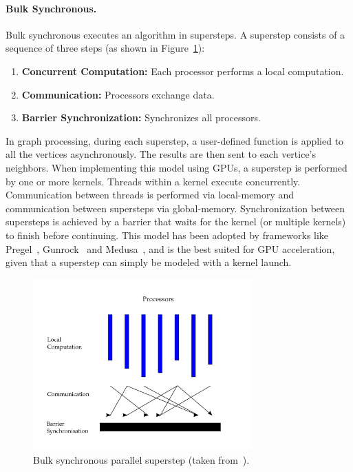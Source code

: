     \paragraph{\textbf{Bulk Synchronous}.} Bulk synchronous executes an algorithm in supersteps. A superstep consists of a sequence of three steps (as shown in Figure~\ref{fig:bsp}):
    \begin{enumerate}
        \item \textbf{Concurrent Computation:} Each processor performs a local computation.
        \item \textbf{Communication:} Processors exchange data.
        \item \textbf{Barrier Synchronization:} Synchronizes all processors.
    \end{enumerate}
    In graph processing, during each superstep, a user-defined function is applied to all the vertices asynchronously. The results are then sent to each vertice's neighbors. 
    When implementing this model using \gls{GPU}s, a superstep is performed by one or more kernels. Threads within a kernel execute concurrently. Communication between threads is performed via local-memory and communication between supersteps via global-memory. Synchronization between supersteps is achieved by a barrier that waits for the kernel (or multiple kernels) to finish before continuing.
    This model has been adopted by frameworks like Pregel~\cite{paper:pregel}, Gunrock~\cite{paper:gunrock} and Medusa~\cite{paper:medusa}, and is the best suited for \gls{GPU} acceleration, given that a superstep can simply be modeled with a kernel launch.

\begin{figure}[tbp]
  \centering
    \includegraphics[width=0.75\textwidth]{Chapters/Figures/Images/bsp.png}
    \caption{Bulk synchronous parallel superstep (taken from~\cite{wiki:bsp}).}
\label{fig:bsp}
\end{figure}

